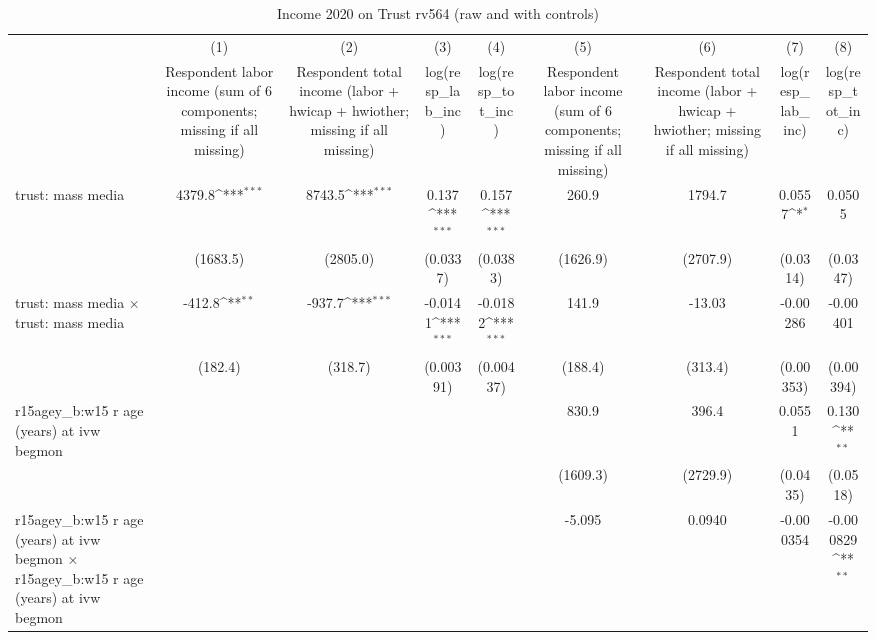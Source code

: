 \begin{table}[htbp]\centering
\def\sym#1{\ifmmode^{#1}\else\(^{#1}\)\fi}
\caption{Income 2020 on Trust rv564 (raw and with controls)}
\begin{tabular}{l*{8}{c}}
\toprule
                &\multicolumn{1}{c}{(1)}&\multicolumn{1}{c}{(2)}&\multicolumn{1}{c}{(3)}&\multicolumn{1}{c}{(4)}&\multicolumn{1}{c}{(5)}&\multicolumn{1}{c}{(6)}&\multicolumn{1}{c}{(7)}&\multicolumn{1}{c}{(8)}\\
                &\multicolumn{1}{c}{Respondent labor income (sum of 6 components; missing if all missing)}&\multicolumn{1}{c}{Respondent total income (labor + hwicap + hwiother; missing if all missing)}&\multicolumn{1}{c}{log(resp\_lab\_inc)}&\multicolumn{1}{c}{log(resp\_tot\_inc)}&\multicolumn{1}{c}{Respondent labor income (sum of 6 components; missing if all missing)}&\multicolumn{1}{c}{Respondent total income (labor + hwicap + hwiother; missing if all missing)}&\multicolumn{1}{c}{log(resp\_lab\_inc)}&\multicolumn{1}{c}{log(resp\_tot\_inc)}\\
\midrule
trust: mass media&   4379.8\sym{***}&   8743.5\sym{***}&    0.137\sym{***}&    0.157\sym{***}&    260.9         &   1794.7         &   0.0557\sym{*}  &   0.0505         \\
                & (1683.5)         & (2805.0)         & (0.0337)         & (0.0383)         & (1626.9)         & (2707.9)         & (0.0314)         & (0.0347)         \\
\addlinespace
trust: mass media $\times$ trust: mass media&   -412.8\sym{**} &   -937.7\sym{***}&  -0.0141\sym{***}&  -0.0182\sym{***}&    141.9         &   -13.03         & -0.00286         & -0.00401         \\
                &  (182.4)         &  (318.7)         &(0.00391)         &(0.00437)         &  (188.4)         &  (313.4)         &(0.00353)         &(0.00394)         \\
\addlinespace
r15agey\_b:w15 r age (years) at ivw begmon&                  &                  &                  &                  &    830.9         &    396.4         &   0.0551         &    0.130\sym{**} \\
                &                  &                  &                  &                  & (1609.3)         & (2729.9)         & (0.0435)         & (0.0518)         \\
\addlinespace
r15agey\_b:w15 r age (years) at ivw begmon $\times$ r15agey\_b:w15 r age (years) at ivw begmon&                  &                  &                  &                  &   -5.095         &   0.0940         &-0.000354         &-0.000829\sym{**} \\

\end{tabular}
\end{table}
